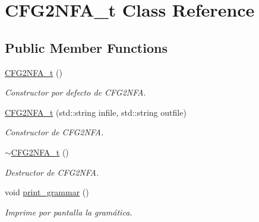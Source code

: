 \hypertarget{classCFG2NFA__t}{}\section{C\+F\+G2\+N\+F\+A\+\_\+t Class Reference}
\label{classCFG2NFA__t}
\subsection*{Public Member Functions}
\begin{DoxyCompactItemize}
\item 
\mbox{\label{classCFG2NFA__t_a811f13a48750f32f51a557cfedb10baf}} 
\hyperlink{classCFG2NFA__t_a811f13a48750f32f51a557cfedb10baf}{C\+F\+G2\+N\+F\+A\+\_\+t} ()
\begin{DoxyCompactList}\small\item\em Constructor por defecto de C\+F\+G2\+N\+FA. \end{DoxyCompactList}\item 
\hyperlink{classCFG2NFA__t_a5601f12afa0cad50ca41a1a9fdfb05cc}{C\+F\+G2\+N\+F\+A\+\_\+t} (std\+::string infile, std\+::string outfile)
\begin{DoxyCompactList}\small\item\em Constructor de C\+F\+G2\+N\+FA. \end{DoxyCompactList}\item 
\mbox{\label{classCFG2NFA__t_a061f20e3b05533dfb844dfbf402d392d}} 
\hyperlink{classCFG2NFA__t_a061f20e3b05533dfb844dfbf402d392d}{$\sim$\+C\+F\+G2\+N\+F\+A\+\_\+t} ()
\begin{DoxyCompactList}\small\item\em Destructor de C\+F\+G2\+N\+FA. \end{DoxyCompactList}\item 
\mbox{\label{classCFG2NFA__t_a7b7cc1a02a497484b73cb93b12fbc9c2}} 
void \hyperlink{classCFG2NFA__t_a7b7cc1a02a497484b73cb93b12fbc9c2}{print\+\_\+grammar} ()
\begin{DoxyCompactList}\small\item\em Imprime por pantalla la gramática. \end{DoxyCompactList}\item 
\mbox{\label{classCFG2NFA__t_a53c3f07450d5ceb2152ecb7e6c93316e}} 

\end{DoxyCompactItemize}

